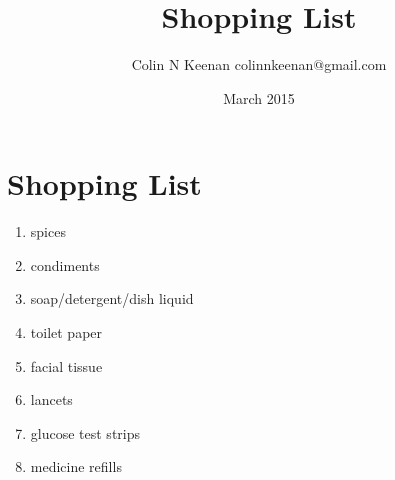\documentclass[12pt,letterpaper]{article}
\newcommand{\mytitle}{Shopping List}
\begin{document}
\title{\mytitle{}}
\author{Colin N Keenan colinnkeenan@gmail.com}
\date{March 2015}
\section*{\mytitle{}}
\begin{enumerate}
	\item spices
	\item condiments
	\item soap/detergent/dish liquid
	\item toilet paper
	\item facial tissue
	\item lancets
	\item glucose test strips
	\item medicine refills
\end{enumerate}
\end{document}
